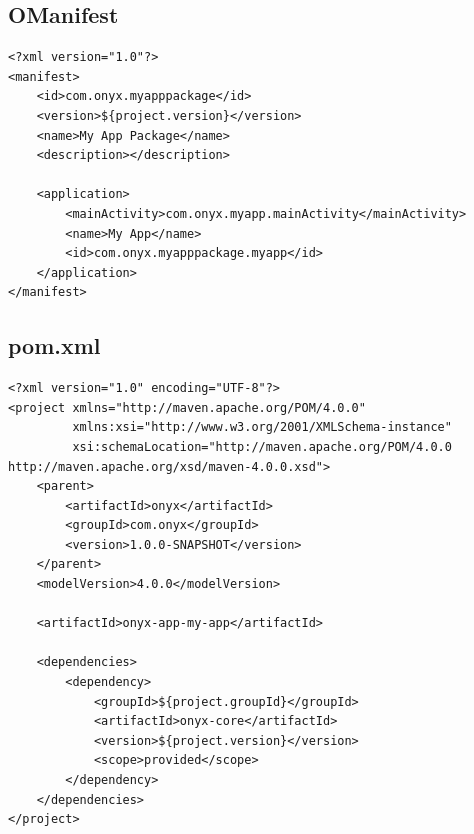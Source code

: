 \subsection{OManifest}


\begin{verbatim}
<?xml version="1.0"?>
<manifest>
    <id>com.onyx.myapppackage</id>
    <version>${project.version}</version>
    <name>My App Package</name>
    <description></description>

    <application>
        <mainActivity>com.onyx.myapp.mainActivity</mainActivity>
        <name>My App</name>
        <id>com.onyx.myapppackage.myapp</id>
    </application>
</manifest>
\end{verbatim}


\subsection{pom.xml}
\begin{verbatim}
<?xml version="1.0" encoding="UTF-8"?>
<project xmlns="http://maven.apache.org/POM/4.0.0"
         xmlns:xsi="http://www.w3.org/2001/XMLSchema-instance"
         xsi:schemaLocation="http://maven.apache.org/POM/4.0.0 http://maven.apache.org/xsd/maven-4.0.0.xsd">
    <parent>
        <artifactId>onyx</artifactId>
        <groupId>com.onyx</groupId>
        <version>1.0.0-SNAPSHOT</version>
    </parent>
    <modelVersion>4.0.0</modelVersion>

    <artifactId>onyx-app-my-app</artifactId>

    <dependencies>
        <dependency>
            <groupId>${project.groupId}</groupId>
            <artifactId>onyx-core</artifactId>
            <version>${project.version}</version>
            <scope>provided</scope>
        </dependency>
    </dependencies>
</project>
\end{verbatim}